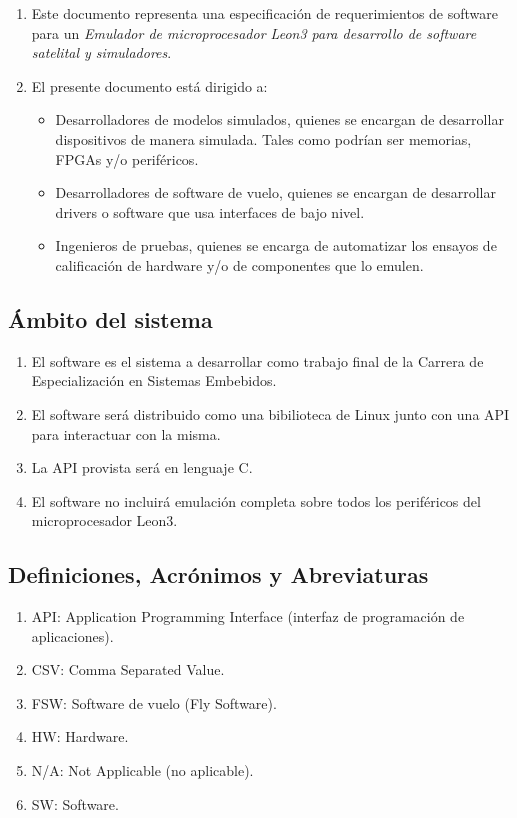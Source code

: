 \documentclass[
  11pt, %
  codirector, %
]{charter}
\begin{document}
\begin{enumerate}
\item Este documento representa una especificación de requerimientos de software para un \textit{Emulador de microprocesador Leon3 para desarrollo de software satelital y simuladores}.

\item El presente documento está dirigido a:

  \begin{itemize}
  \item Desarrolladores de modelos simulados, quienes se encargan de desarrollar dispositivos de manera simulada.  Tales como podrían ser memorias, FPGAs y/o periféricos.

  \item Desarrolladores de software de vuelo, quienes se encargan de desarrollar drivers o software que usa interfaces de bajo nivel.

  \item Ingenieros de pruebas, quienes se encarga de automatizar los    ensayos de calificación de hardware y/o de componentes que lo emulen.
  \end{itemize}

\end{enumerate}


\subsection{Ámbito del sistema}
\label{sec:org12e44a1}

\begin{enumerate}
\item El software es el sistema a desarrollar como trabajo final de la Carrera de Especialización en Sistemas Embebidos.
\item El software será distribuido como una bibilioteca de Linux junto con una API para interactuar con la misma.
\item La API provista será en lenguaje C.
\item El software no incluirá emulación completa sobre todos los periféricos del microprocesador Leon3.
\end{enumerate}


\subsection{Definiciones, Acrónimos y Abreviaturas}
\label{sec:orgb158e36}

\begin{enumerate}
\item API: Application Programming Interface (interfaz de programación de aplicaciones).
\item CSV: Comma Separated Value.
\item FSW: Software de vuelo (Fly Software).
\item HW: Hardware.
\item N/A: Not Applicable (no aplicable).
\item SW: Software.
\end{enumerate}
\end{document}
